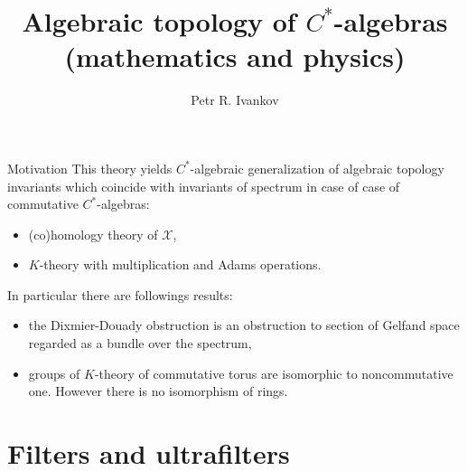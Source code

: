 \documentclass{beamer}
\title{Algebraic topology of $C^*$-algebras\\ { \fontsize{3}{1} (mathematics and physics)}}
\institute
{
Algebreas in analisys\\
https://arxiv.org/abs/2511.09189
}
\author{Petr R. Ivankov  }
\theoremstyle{plain}
\newcommand{\sX}{\mathcal{X}}       %
\begin{document}
\begin{frame}
  \titlepage
\end{frame}

\begin{frame}
		{\Large Motivation}
This theory yields $C^*$-algebraic  generalization of algebraic topology invariants which coincide  with invariants of spectrum in case of case of commutative $C^*$-algebras:
\begin{itemize}
	\item (co)homology theory of $\sX$,
	\item $K$-theory  with multiplication and Adams operations.
\end{itemize}
In particular there are followings results:
\begin{itemize}
	\item the Dixmier-Douady obstruction is an obstruction to section of Gelfand space regarded as a bundle over the spectrum,
	\item groups of  $K$-theory  of commutative torus are isomorphic to noncommutative one. However there is no isomorphism of rings. 
\end{itemize}

\end{frame}

\section{Filters and ultrafilters}

	
\end{document}
